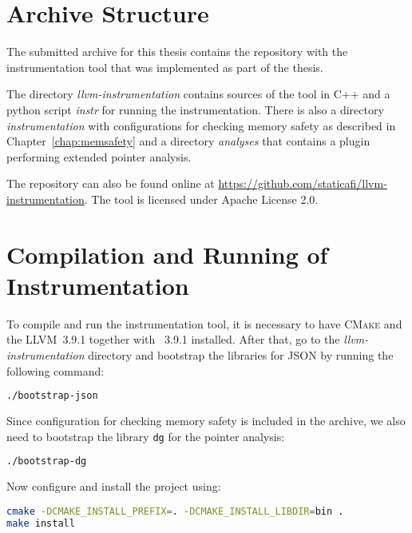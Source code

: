 
\section{Archive Structure}

The submitted archive for this thesis contains the repository with the
instrumentation tool that was implemented as part of the thesis.

The directory \emph{llvm-instrumentation} contains sources of the tool in C++
and a python script \emph{instr} for running the instrumentation. There is also
a directory \emph{instrumentation} with configurations for checking memory
safety as described in Chapter~\ref{chap:memsafety} and a directory
\emph{analyses} that contains a plugin performing extended pointer analysis.

The repository can also be found online at
\url{https://github.com/staticafi/llvm-instrumentation}. The tool is licensed
under Apache License 2.0.

\section{Compilation and Running of Instrumentation}

To compile and run the instrumentation tool, it is necessary to have
\textsc{CMake} and the LLVM~3.9.1 together with \clang~3.9.1 installed. After
that, go to the \emph{llvm-instrumentation} directory and bootstrap the
libraries for JSON by running the following command:

\begin{lstlisting}[language=bash]
./bootstrap-json
\end{lstlisting}

\noindent Since configuration for checking memory safety is included in the archive, we
also need to bootstrap the library \texttt{dg} for the pointer analysis:

\begin{lstlisting}[language=bash]
./bootstrap-dg
\end{lstlisting}

\noindent Now configure and install the project using:

\begin{lstlisting}[language=bash]
cmake -DCMAKE_INSTALL_PREFIX=. -DCMAKE_INSTALL_LIBDIR=bin .
make install
\end{lstlisting}

